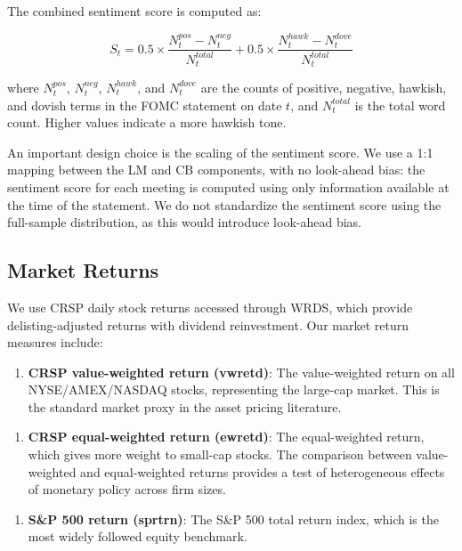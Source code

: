The combined sentiment score is computed as:

\begin{equation*}
S_t = 0.5 \times \frac{N^{pos}_t - N^{neg}_t}{N^{total}_t} + 0.5 \times \frac{N^{hawk}_t - N^{dove}_t}{N^{total}_t}
\end{equation*}

where $N^{pos}_t$, $N^{neg}_t$, $N^{hawk}_t$, and $N^{dove}_t$ are the counts of positive, negative, hawkish, and dovish terms in the FOMC statement on date $t$, and $N^{total}_t$ is the total word count. Higher values indicate a more hawkish tone.

An important design choice is the scaling of the sentiment score. We use a 1:1 mapping between the LM and CB components, with no look-ahead bias: the sentiment score for each meeting is computed using only information available at the time of the statement. We do not standardize the sentiment score using the full-sample distribution, as this would introduce look-ahead bias.

\subsection{Market Returns}

We use CRSP daily stock returns accessed through WRDS, which provide delisting-adjusted returns with dividend reinvestment. Our market return measures include:

\begin{enumerate}
\item \textbf{CRSP value-weighted return (vwretd)}: The value-weighted return on all NYSE/AMEX/NASDAQ stocks, representing the large-cap market. This is the standard market proxy in the asset pricing literature.
\end{enumerate}

\begin{enumerate}
\item \textbf{CRSP equal-weighted return (ewretd)}: The equal-weighted return, which gives more weight to small-cap stocks. The comparison between value-weighted and equal-weighted returns provides a test of heterogeneous effects of monetary policy across firm sizes.
\end{enumerate}

\begin{enumerate}
\item \textbf{S\&P 500 return (sprtrn)}: The S\&P 500 total return index, which is the most widely followed equity benchmark.
\end{enumerate}

